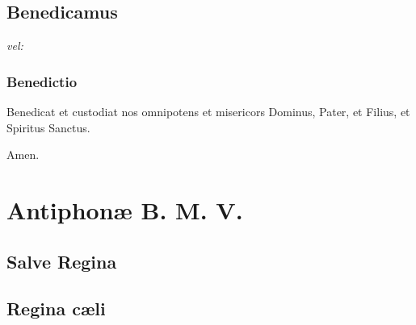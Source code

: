 \documentclass[initial=ZallmanCaps,staff=19,font=greciliae,11pt,a4paper,openany,twoside,choralsign=PfefferMediaeval]{gregorian}
\begin{document}
\section*{Benedicamus}
\par
\textit{vel:}\par
{}
\par
\subsection*{Benedictio}
\Vbar Benedicat et custodiat nos omnipotens et misericors Dominus, \grecross Pater, et Filius, et Spiritus Sanctus.\par
\Rbar Amen.
\begin{center}
{\centering{\scalebox{3}{\grecross}}}
\end{center}
\chapter{Antiphonæ B. M. V.}
\section*{Salve Regina}\par
{}
\newpage
\section*{Regina cæli}\par
{}
\par
\begin{center}
{\centering{\scalebox{3}{\grecross}}}
\end{center}
\end{document}
